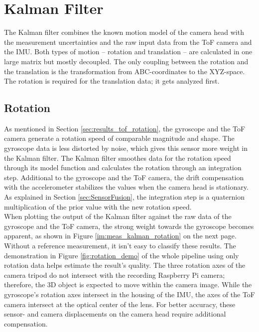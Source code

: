 \section{Kalman Filter}
\label{sec:kalman_results}
The Kalman filter combines the known motion model of the camera head with the measurement uncertainties and the raw input data from the ToF camera and the IMU. Both types of motion – rotation and translation – are calculated in one large matrix but mostly decoupled. The only coupling between the rotation and the translation is the transformation from ABC-coordinates to the XYZ-space. The rotation is required for the translation data; it gets analyzed first.
\subsection{Rotation}
\label{sec:kalman_rotation_results}
As mentioned in Section \ref{sec:results_tof_rotation}, the gyroscope and the ToF camera generate a rotation speed of comparable magnitude and shape. The gyroscope data is less distorted by noise, which gives this sensor more weight in the Kalman filter. 
The Kalman filter smoothes data for the rotation speed through its model function and calculates the rotation through an integration step. Additional to the gyroscope and the ToF camera, the drift compensation with the accelerometer stabilizes the values when the camera head is stationary.\\ 
As explained in Section \ref{sec:SensorFusion}, the integration step is a quaternion multiplication of the prior value with the new rotation speed.\\
When plotting the output of the Kalman filter against the raw data of the gyroscope and the ToF camera, the strong weight towards the gyroscope becomes apparent, as shown in Figure \ref{im:meas_kalman_rotation} on the next page.\\
Without a reference measurement, it isn't easy to classify these results. The demonstration in Figure \ref{fig:rotation_demo} of the whole pipeline using only rotation data helps estimate the result's quality. The three rotation axes of the camera tripod do not intersect with the recording Raspberry Pi camera; therefore, the 3D object is expected to move within the camera image. While the gyroscope's rotation axes intersect in the housing of the IMU, the axes of the ToF camera intersect at the optical center of the lens. For better accuracy, these sensor- and camera displacements on the camera head require additional compensation. 
